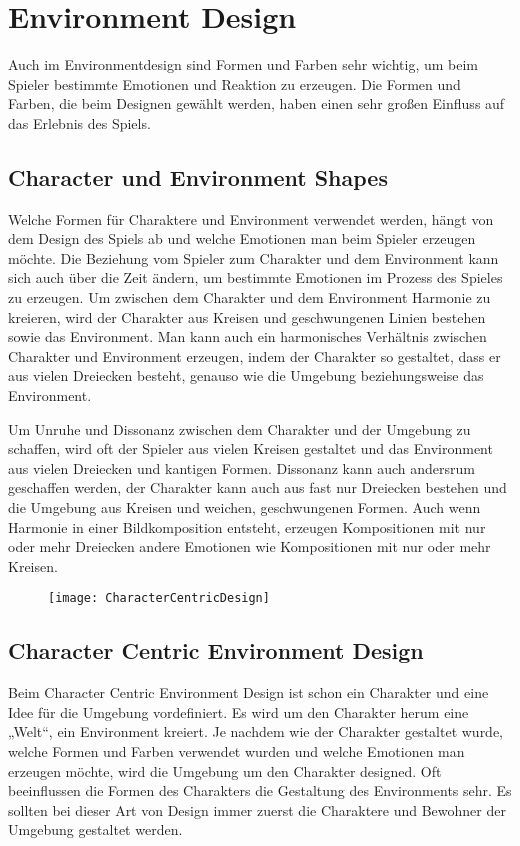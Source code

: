 \section{Environment Design}
Auch im Environmentdesign sind Formen und Farben sehr wichtig, um beim Spieler bestimmte Emotionen und Reaktion zu erzeugen. Die Formen und Farben, die beim Designen gewählt werden, haben einen sehr großen Einfluss auf das Erlebnis des Spiels.
\cite{solarski2012drawing}

\subsection{Character und Environment Shapes}
Welche Formen für Charaktere und Environment verwendet werden, hängt von dem Design des Spiels ab und welche Emotionen man beim Spieler erzeugen möchte. Die Beziehung vom Spieler zum Charakter und dem Environment kann sich auch über die Zeit ändern, um bestimmte Emotionen im Prozess des Spieles zu erzeugen. 
Um zwischen dem Charakter und dem Environment Harmonie zu kreieren, wird der Charakter aus Kreisen und geschwungenen Linien bestehen sowie das Environment. Man kann auch ein harmonisches Verhältnis zwischen Charakter und Environment erzeugen, indem der Charakter so gestaltet, dass er aus vielen Dreiecken besteht, genauso wie die Umgebung beziehungsweise das Environment.

Um Unruhe und Dissonanz zwischen dem Charakter und der Umgebung zu schaffen, wird oft der Spieler aus vielen Kreisen gestaltet und das Environment aus vielen Dreiecken und kantigen Formen. Dissonanz kann auch andersrum geschaffen werden, der Charakter kann auch aus fast nur Dreiecken bestehen und die Umgebung aus Kreisen und weichen, geschwungenen Formen. 
Auch wenn Harmonie in einer Bildkomposition entsteht, erzeugen Kompositionen mit nur oder mehr Dreiecken andere Emotionen wie Kompositionen mit nur oder mehr Kreisen.
\cite{solarski2012drawing}

\begin{figure}[H]
	\centering
	\texttt{[image: CharacterCentricDesign]}
	\caption{\cite{solarski2012drawing}}
\end{figure}

\subsection{Character Centric Environment Design }
Beim Character Centric Environment Design ist schon ein Charakter und eine Idee für die Umgebung vordefiniert. Es wird um den Charakter herum eine „Welt“, ein Environment kreiert. Je nachdem wie der Charakter gestaltet wurde, welche Formen und Farben verwendet wurden und welche Emotionen man erzeugen möchte, wird die Umgebung um den Charakter designed. Oft beeinflussen die Formen des Charakters die Gestaltung des Environments sehr. Es sollten bei dieser Art von Design immer zuerst die Charaktere und Bewohner der Umgebung gestaltet werden.
\cite{solarski2012drawing}








